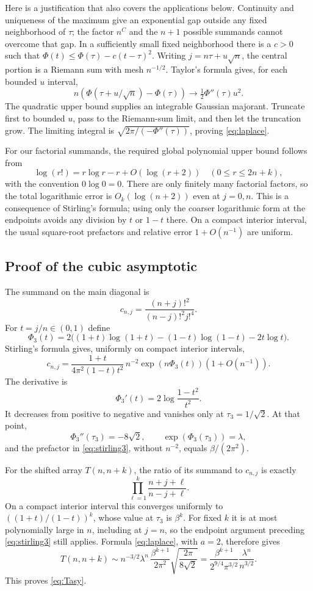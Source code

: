 \documentclass[11pt]{article}
\numberwithin{equation}{section}
\theoremstyle{definition}
\theoremstyle{remark}
\begin{document}
Here is a justification that also covers the applications below.
Continuity and uniqueness of the maximum give an exponential gap
outside any fixed neighborhood of $\tau$; the factor $n^C$ and the
$n+1$ possible summands cannot overcome that gap.
In a sufficiently small fixed neighborhood there is a $c>0$ such that
$\Phi(t)\leq\Phi(\tau)-c(t-\tau)^2$.
Writing $j=n\tau+u\sqrt n$, the central portion is a Riemann sum with
mesh $n^{-1/2}$. Taylor's formula gives, for each bounded $u$ interval,
\[
 n(\Phi(\tau+u/\sqrt n)-\Phi(\tau))
 \longrightarrow\tfrac12\Phi''(\tau)u^2.
\]
The quadratic upper bound supplies an integrable Gaussian majorant.
Truncate first to bounded $u$, pass to the Riemann-sum limit, and then
let the truncation grow. The limiting integral is
$\sqrt{2\pi/(-\Phi''(\tau))}$, proving \eqref{eq:laplace}.

For our factorial summands, the required global polynomial upper bound
follows from
\[
 \log(r!)=r\log r-r+O(\log(r+2))\quad(0\leq r\leq 2n+k),
\]
with the convention $0\log0=0$. There are only finitely many factorial
factors, so the total logarithmic error is $O_k(\log(n+2))$ even at
$j=0,n$. This is a consequence of Stirling's formula; using only the
coarser logarithmic form at the endpoints avoids any division by $t$
or $1-t$ there. On a compact interior interval, the usual square-root
prefactors and relative error $1+O(n^{-1})$ are uniform.

\subsection{Proof of the cubic asymptotic}
The summand on the main diagonal is
\[
 c_{n,j}=\frac{(n+j)!^2}{(n-j)!^2j!^4}.
\]
For $t=j/n\in(0,1)$ define
\[
 \Phi_3(t)=2\bigl((1+t)\log(1+t)
 -(1-t)\log(1-t)-2t\log t\bigr).
\]
Stirling's formula gives, uniformly on compact interior intervals,
\begin{equation}\label{eq:stirling3}
 c_{n,j}=\frac{1+t}{4\pi^2(1-t)t^2}\,
 n^{-2}\exp(n\Phi_3(t))(1+O(n^{-1})).
\end{equation}
The derivative is
\[
 \Phi_3'(t)=2\log\frac{1-t^2}{t^2}.
\]
It decreases from positive to negative and vanishes only at
$\tau_3=1/\sqrt2$. At that point,
\[
 \Phi_3''(\tau_3)=-8\sqrt2,\qquad
 \exp(\Phi_3(\tau_3))=\lambda,
\]
and the prefactor in \eqref{eq:stirling3}, without $n^{-2}$, equals
$\beta/(2\pi^2)$.

For the shifted array $T(n,n+k)$, the ratio of its summand to
$c_{n,j}$ is exactly
\begin{equation}\label{eq:shiftratioT}
 \prod_{\ell=1}^k\frac{n+j+\ell}{n-j+\ell}.
\end{equation}
On a compact interior interval this converges uniformly to
$((1+t)/(1-t))^k$, whose value at $\tau_3$ is $\beta^k$.
For fixed $k$ it is at most polynomially large in $n$, including at
$j=n$, so the endpoint argument preceding \eqref{eq:stirling3} still
applies. Formula \eqref{eq:laplace}, with $a=2$, therefore gives
\[
 T(n,n+k)\sim n^{-3/2}\lambda^n\,
 \frac{\beta^{k+1}}{2\pi^2}
 \sqrt{\frac{2\pi}{8\sqrt2}}
 =\frac{\beta^{k+1}}{2^{9/4}\pi^{3/2}}
 \frac{\lambda^n}{n^{3/2}}.
\]
This proves \eqref{eq:Tasy}.
\end{document}
